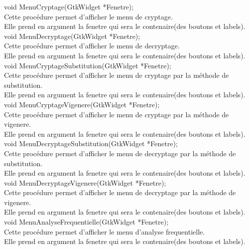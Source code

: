 \documentclass[a4]{article}
\begin{document}
	void MenuCryptage(GtkWidget *Fenetre);\\
		Cette procédure permet d'afficher le menu de cryptage.\\
		Elle prend en argument la fenetre qui sera le contenaire(des boutons et labels).\\

	
	void MenuDecryptage(GtkWidget *Fenetre);\\
		Cette procédure permet d'afficher le menu de decryptage.\\
		Elle prend en argument la fenetre qui sera le contenaire(des boutons et labels).\\

	
	void MenuCryptageSubstitution(GtkWidget *Fenetre);\\
		Cette procédure permet d'afficher le menu de cryptage par la méthode de substitution.\\
		Elle prend en argument la fenetre qui sera le contenaire(des boutons et labels).\\

	
	void MenuCryptageVigenere(GtkWidget *Fenetre);\\
		Cette procédure permet d'afficher le menu de cryptage par la méthode de vigenere.\\
		Elle prend en argument la fenetre qui sera le contenaire(des boutons et labels).\\
	
	void MenuDecryptageSubstitution(GtkWidget *Fenetre);\\
		Cette procédure permet d'afficher le menu de decryptage par la méthode de substitution.\\
		Elle prend en argument la fenetre qui sera le contenaire(des boutons et labels).\\
	
	void MenuDecryptageVigenere(GtkWidget *Fenetre);\\
		Cette procédure permet d'afficher le menu de decryptage par la méthode de vigenere.\\
		Elle prend en argument la fenetre qui sera le contenaire(des boutons et labels).\\
	
	void MenuAnalyseFrequentielle(GtkWidget *Fenetre);\\
		Cette procédure permet d'afficher le menu d'analyse frequentielle.\\
		Elle prend en argument la fenetre qui sera le contenaire(des boutons et labels).\\
	
\end{document}
